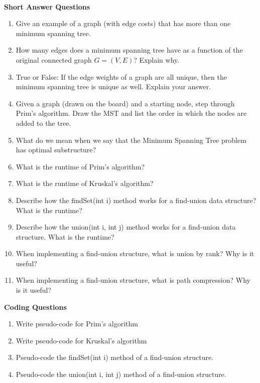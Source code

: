 \documentclass[10pt]{article}
\begin{document}
\noindent \\
\textbf{Short Answer Questions}

\begin{enumerate}
	\setlength\itemsep{0.25em}
	\item Give an example of a graph (with edge costs) that has more than one minimum spanning tree.
	\item How many edges does a minimum spanning tree have as a function of the original connected graph $G=(V,E)$? Explain why.
	\item True or False: If the edge weights of a graph are all unique, then the minimum spanning tree is unique as well. Explain your answer.
	\item Given a graph (drawn on the board) and a starting node, step through Prim's algorithm. Draw the MST and list the order in which the nodes are added to the tree.
	\item What do we mean when we say that the Minimum Spanning Tree problem has optimal substructure?
	\item What is the runtime of Prim's algorithm?
	\item What is the runtime of Kruskal's algorithm?
	\item Describe how the findSet(int i) method works for a find-union data structure? What is the runtime?
	\item Describe how the union(int i, int j) method works for a find-union data structure. What is the runtime?
	\item When implementing a find-union structure, what is union by rank? Why is it useful?
	\item When implementing a find-union structure, what is path compression? Why is it useful?

\end{enumerate}

\vspace{0.5in}

\textbf{Coding Questions}
\begin{enumerate}
	\setlength\itemsep{0.25em}
	\item Write pseudo-code for Prim's algorithm
	\item Write pseudo-code for Kruskal's algorithm
	\item Pseudo-code the findSet(int i) method of a find-union structure.
	\item Pseudo-code the union(int i, int j) method of a find-union structure.

\end{enumerate}
\end{document}
